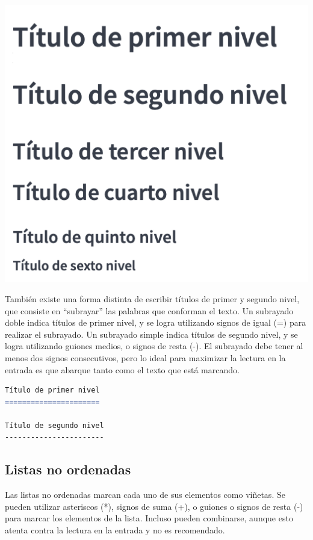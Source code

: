 \includegraphics[]{anexos/markdown/imagenes/md_titulos.png}

También existe una forma distinta de escribir títulos de primer y segundo
nivel, que consiste en ``subrayar'' las palabras que conforman el texto.
Un subrayado doble indica títulos de primer nivel, y se logra utilizando
signos de igual (=) para realizar el subrayado. Un subrayado simple indica
títulos de segundo nivel, y se logra utilizando guiones medios, o signos de
resta (-). El subrayado debe tener al menos dos signos consecutivos, pero
lo ideal para maximizar la lectura en la entrada es que abarque tanto como
el texto que está marcando.

\begin{lstlisting}[language=Markdown,otherkeywords={=,-},morekeywords={[2]{=,-}}]
Título de primer nivel
======================

Título de segundo nivel
-----------------------
\end{lstlisting}

\subsection*{Listas no ordenadas}

Las listas no ordenadas marcan cada uno de sus elementos como viñetas.
Se pueden utilizar asteriscos (*), signos de suma (+), o guiones o signos
de resta (-) para marcar los elementos de la lista. Incluso pueden combinarse,
aunque esto atenta contra la lectura en la entrada y no es recomendado.

